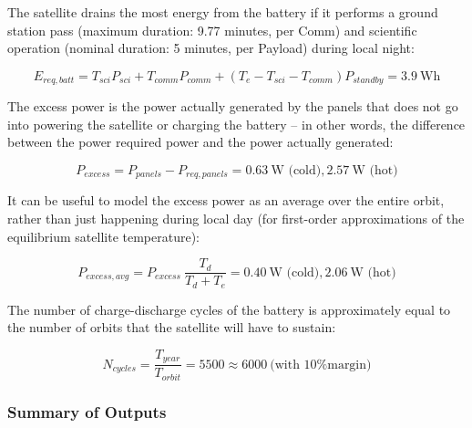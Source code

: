 \documentclass[12pt]{article}
\begin{document}
The satellite drains the most energy from the battery if it performs a ground station pass (maximum duration: 9.77 minutes, per Comm) and scientific operation (nominal duration: 5 minutes, per Payload) during local night:

\begin{equation}
E_{req,batt} = T_{sci} P_{sci} + T_{comm} P_{comm} + (T_e - T_{sci} - T_{comm}) P_{standby} = 3.9 \ \text{Wh}
\label{eq:power-batt-req}
\end{equation}

The excess power is the power actually generated by the panels that does not go into powering the satellite or charging the battery -- in other words, the difference between the power required power and the power actually generated:

\begin{equation}
P_{excess} = P_{panels} - P_{req,panels} = 0.63 \ \text{W (cold)}, 2.57 \ \text{W (hot)}
\label{eq:power-excess}
\end{equation}

It can be useful to model the excess power as an average over the entire orbit, rather than just happening during local day (for first-order approximations of the equilibrium satellite temperature):

\begin{equation}
P_{excess,avg} = P_{excess} \: \frac{T_d}{T_d + T_e} = 0.40 \ \text{W (cold)}, 2.06 \ \text{W (hot)}
\label{eq:power-excess-avg}
\end{equation}

The number of charge-discharge cycles of the battery is approximately equal to the number of orbits that the satellite will have to sustain:

\begin{equation}
N_{cycles} = \frac{T_{year}}{T_{orbit}} = 5500 \approx 6000 \ \text{(with 10\% margin)}
\label{eq:power-num-cycles}
\end{equation}

			\subsubsection{Summary of Outputs}
\end{document}
